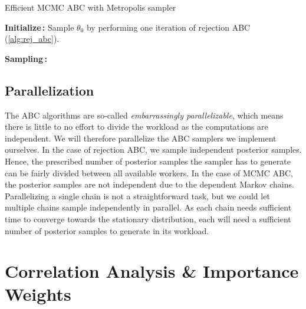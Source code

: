 \begin{algorithm}[!htb]
\caption{Efficient MCMC ABC with Metropolis sampler}
\label{alg:mcmcabc_efficient}
\SetAlgoLined
\DontPrintSemicolon
 \textbf{Initialize\,:}\;
 \nl Sample $\theta_0$ by performing one iteration of rejection ABC (\cref{alg:rej_abc}).\;

 \vspace{5mm}
 \textbf{Sampling\,:}\;
\end{algorithm}


\subsection{Parallelization}

The ABC algorithms are so-called \textit{embarrassingly parallelizable}, which means there is little to no effort to divide the workload as the computations are independent. We will therefore parallelize the ABC samplers we implement ourselves. In the case of rejection ABC, we sample independent posterior samples. Hence, the prescribed number of posterior samples the sampler has to generate can be fairly divided between all available workers. In the case of MCMC ABC, the posterior samples are not independent due to the dependent Markov chains. Parallelizing a single chain is not a straightforward task, but we could let multiple chains sample independently in parallel. As each chain needs sufficient time to converge towards the stationary distribution, each will need a sufficient number of posterior samples to generate in its workload. 

\section{Correlation Analysis \& Importance Weights}


